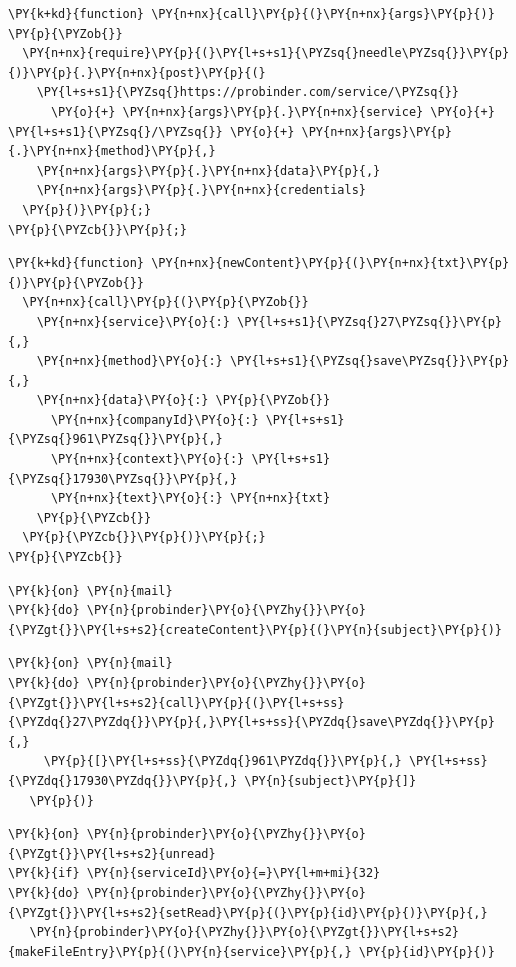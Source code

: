 \newpage

\begin{Verbatim}[commandchars=\\\{\}]
\PY{k+kd}{function} \PY{n+nx}{call}\PY{p}{(}\PY{n+nx}{args}\PY{p}{)} \PY{p}{\PYZob{}}
  \PY{n+nx}{require}\PY{p}{(}\PY{l+s+s1}{\PYZsq{}needle\PYZsq{}}\PY{p}{)}\PY{p}{.}\PY{n+nx}{post}\PY{p}{(}
    \PY{l+s+s1}{\PYZsq{}https://probinder.com/service/\PYZsq{}} 
      \PY{o}{+} \PY{n+nx}{args}\PY{p}{.}\PY{n+nx}{service} \PY{o}{+} \PY{l+s+s1}{\PYZsq{}/\PYZsq{}} \PY{o}{+} \PY{n+nx}{args}\PY{p}{.}\PY{n+nx}{method}\PY{p}{,}
    \PY{n+nx}{args}\PY{p}{.}\PY{n+nx}{data}\PY{p}{,}
    \PY{n+nx}{args}\PY{p}{.}\PY{n+nx}{credentials}
  \PY{p}{)}\PY{p}{;}
\PY{p}{\PYZcb{}}\PY{p}{;}
\end{Verbatim}


\begin{Verbatim}[commandchars=\\\{\}]
\PY{k+kd}{function} \PY{n+nx}{newContent}\PY{p}{(}\PY{n+nx}{txt}\PY{p}{)}\PY{p}{\PYZob{}}
  \PY{n+nx}{call}\PY{p}{(}\PY{p}{\PYZob{}}
    \PY{n+nx}{service}\PY{o}{:} \PY{l+s+s1}{\PYZsq{}27\PYZsq{}}\PY{p}{,}
    \PY{n+nx}{method}\PY{o}{:} \PY{l+s+s1}{\PYZsq{}save\PYZsq{}}\PY{p}{,}
    \PY{n+nx}{data}\PY{o}{:} \PY{p}{\PYZob{}}
      \PY{n+nx}{companyId}\PY{o}{:} \PY{l+s+s1}{\PYZsq{}961\PYZsq{}}\PY{p}{,}
      \PY{n+nx}{context}\PY{o}{:} \PY{l+s+s1}{\PYZsq{}17930\PYZsq{}}\PY{p}{,}
      \PY{n+nx}{text}\PY{o}{:} \PY{n+nx}{txt}
    \PY{p}{\PYZcb{}}
  \PY{p}{\PYZcb{}}\PY{p}{)}\PY{p}{;}
\PY{p}{\PYZcb{}}
\end{Verbatim}

\begin{Verbatim}[commandchars=\\\{\}]
\PY{k}{on} \PY{n}{mail}
\PY{k}{do} \PY{n}{probinder}\PY{o}{\PYZhy{}}\PY{o}{\PYZgt{}}\PY{l+s+s2}{createContent}\PY{p}{(}\PY{n}{subject}\PY{p}{)}
\end{Verbatim}


\begin{Verbatim}[commandchars=\\\{\}]
\PY{k}{on} \PY{n}{mail}
\PY{k}{do} \PY{n}{probinder}\PY{o}{\PYZhy{}}\PY{o}{\PYZgt{}}\PY{l+s+s2}{call}\PY{p}{(}\PY{l+s+ss}{\PYZdq{}27\PYZdq{}}\PY{p}{,}\PY{l+s+ss}{\PYZdq{}save\PYZdq{}}\PY{p}{,}
     \PY{p}{[}\PY{l+s+ss}{\PYZdq{}961\PYZdq{}}\PY{p}{,} \PY{l+s+ss}{\PYZdq{}17930\PYZdq{}}\PY{p}{,} \PY{n}{subject}\PY{p}{]}
   \PY{p}{)}
\end{Verbatim}


\begin{Verbatim}[commandchars=\\\{\}]
\PY{k}{on} \PY{n}{probinder}\PY{o}{\PYZhy{}}\PY{o}{\PYZgt{}}\PY{l+s+s2}{unread}
\PY{k}{if} \PY{n}{serviceId}\PY{o}{=}\PY{l+m+mi}{32}
\PY{k}{do} \PY{n}{probinder}\PY{o}{\PYZhy{}}\PY{o}{\PYZgt{}}\PY{l+s+s2}{setRead}\PY{p}{(}\PY{p}{id}\PY{p}{)}\PY{p}{,}
   \PY{n}{probinder}\PY{o}{\PYZhy{}}\PY{o}{\PYZgt{}}\PY{l+s+s2}{makeFileEntry}\PY{p}{(}\PY{n}{service}\PY{p}{,} \PY{p}{id}\PY{p}{)}
\end{Verbatim}

